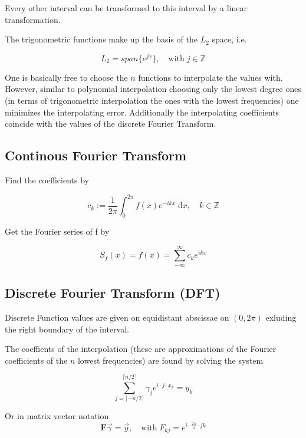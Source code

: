 \documentclass[
    a4paper,
    11pt
]{article}
\begin{document}
Every other interval can be transformed to this interval by a linear
transformation.

The trigonometric functions make up the basis of the $L_2$ space, i.e.

\begin{equation}
    L_2 = span \{e^{jx} \}, \quad \text{with} \; j \in \mathbb{Z}
\end{equation}

One is basically free to choose the $n$ functions to interpolate the values
with. However, similar to polynomial interpolation choosing only the lowest
degree ones (in terms of trigonometric interpolation the ones with the lowest
frequencies) one minimizes the interpolating error. Additionally the
interpolating coefficients coincide with the values of the discrete Fourier
Transform.

\subsection{Continous Fourier Transform}

Find the coefficients by 

\begin{equation}
    c_k := \frac{1}{2\pi} \int_0^{2\pi} f(x) e^{-ikx} \; \mathrm{d} x, \quad k
    \in \mathbb{Z}
\end{equation}

Get the Fourier series of f by

\begin{equation}
    S_f(x) = f(x) = \sum_{-\infty}^{\infty}c_k e^{ikx}
\end{equation}

\subsection{Discrete Fourier Transform (DFT)}

Discrete Function values are given on equidistant abscissae on $(0, 2\pi)$
exluding the right boundary of the interval.

The coeffients of the interpolation (these are approximations of the Fourier
coefficients of the $n$ lowest frequencies) are found by solving the system

\begin{equation}
    \sum_{j=\lceil -n/2 \rceil}^{\lceil n/2 \rceil} \gamma_j e^{i\cdot j \cdot x_k} = y_k
\end{equation}

Or in matrix vector notation
\begin{equation}
    \mathbf{F} \vec{\gamma} = \vec{y}, \quad \text{with} \; F_{kj} = e^{i\cdot
    \frac{2\pi}{n} \cdot jk}
\end{equation}
\end{document}
